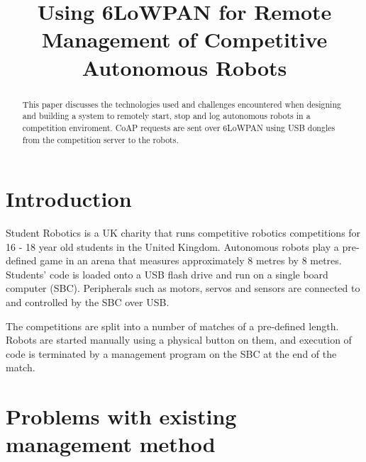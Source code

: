 \documentclass[conference]{IEEEtran}
\begin{document}
\title{Using 6LoWPAN for Remote Management of Competitive Autonomous Robots\\
}

\author{
}

\maketitle

\begin{abstract}
This paper discusses the technologies used and challenges encountered when designing and building a system to remotely start, stop and log autonomous robots in a competition enviroment.
CoAP requests are sent over 6LoWPAN using USB dongles from the competition server to the robots.
\end{abstract}


\section{Introduction}

Student Robotics is a UK charity that runs competitive robotics competitions for 16 - 18 year old students in the United Kingdom. Autonomous robots play a pre-defined game in an arena that measures approximately 8 metres by 8 metres. Students' code is loaded onto a USB flash drive and run on a single board computer (SBC). Peripherals such as motors, servos and sensors are connected to and controlled by the SBC over USB.

The competitions are split into a number of matches of a pre-defined length. Robots are started manually using a physical button on them, and execution of code is terminated by a management program on the SBC at the end of the match.

\section{Problems with existing management method}
\end{document}
